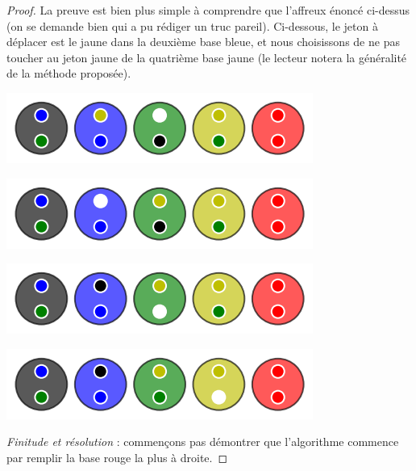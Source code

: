 \begin{proof}
    \medskip

    La preuve est bien plus simple à comprendre que l'affreux énoncé ci-dessus (on se demande bien qui a pu rédiger un truc pareil). Ci-dessous, le jeton à déplacer est le jaune dans la deuxième base bleue, et nous choisissons de ne pas toucher au jeton jaune de la quatrième base jaune (le lecteur notera la généralité de la méthode proposée).

    \vspace{-0.4em}
    \begin{center}   %
        \includegraphics[scale= 0.45]{content/algo_selection/fact_2/000.png}

        \includegraphics[scale= 0.45]{content/algo_selection/fact_2/001.png}

        \includegraphics[scale= 0.45]{content/algo_selection/fact_2/002.png}

        \includegraphics[scale= 0.45]{content/algo_selection/fact_2/003.png}

    \end{center}

    \vspace{-0.8em}


    \medskip

    \textit{Finitude et résolution} : commençons pas démontrer que l'algorithme commence par remplir la base rouge la plus à droite.



\end{proof}
